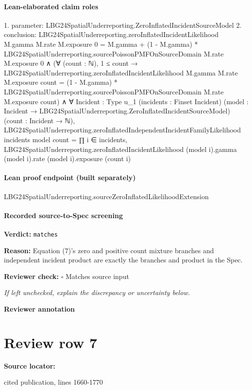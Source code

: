 \documentclass[10pt]{article}
\newcommand{\reviewerbox}{%
  \par\noindent\fbox{\parbox{0.96\linewidth}{\rule{0pt}{0.38in}}}\par
}
\newcommand{\reviewmatch}[1]{%
  \par\noindent\textbf{Reviewer check:} $\square$\; #1\par
  \noindent\emph{If left unchecked, explain the discrepancy or uncertainty below.}\par
}
\begin{document}
\paragraph{Lean-elaborated claim roles}\begin{ReviewVerbatim}
1. parameter: LBG24SpatialUnderreporting.ZeroInflatedIncidentSourceModel
2. conclusion: LBG24SpatialUnderreporting.zeroInflatedIncidentLikelihood M.gamma M.rate M.exposure 0 =
    M.gamma + (1 - M.gamma) * LBG24SpatialUnderreporting.sourcePoissonPMFOnSourceDomain M.rate M.exposure 0 ∧
  (∀ (count : ℕ),
      1 ≤ count →
        LBG24SpatialUnderreporting.zeroInflatedIncidentLikelihood M.gamma M.rate M.exposure count =
          (1 - M.gamma) * LBG24SpatialUnderreporting.sourcePoissonPMFOnSourceDomain M.rate M.exposure count) ∧
    ∀ {Incident : Type u_1} (incidents : Finset Incident)
      (model : Incident → LBG24SpatialUnderreporting.ZeroInflatedIncidentSourceModel) (count : Incident → ℕ),
      LBG24SpatialUnderreporting.zeroInflatedIndependentIncidentFamilyLikelihood incidents model count =
        ∏ i ∈ incidents,
          LBG24SpatialUnderreporting.zeroInflatedIncidentLikelihood (model i).gamma (model i).rate (model i).exposure
            (count i)
\end{ReviewVerbatim}

\paragraph{Lean proof endpoint (built separately)}\begin{ReviewVerbatim}
LBG24SpatialUnderreporting.sourceZeroInflatedLikelihoodExtension
\end{ReviewVerbatim}

\paragraph{Recorded source-to-Spec screening}
\textbf{Verdict:} \texttt{matches}
\\
{\raggedright
\textbf{Reason:} Equation (7)'s zero and positive count mixture branches and independent incident product are exactly the branches and product in the Spec.\allowbreak{}
\par}
\reviewmatch{Matches source input}
\noindent\textbf{Reviewer annotation}\par
\reviewerbox
\clearpage
\hypertarget{source-claim-5df3c4be72017231}{}
\section*{Review row 7}
\textbf{Source locator:} {\footnotesize\raggedright cited publication, lines 1660-\allowbreak{}1770\par}
\end{document}
